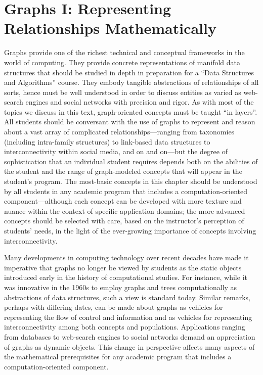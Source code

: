 
\chapter{Graphs I:
Representing Relationships Mathematically}
\label{ch:Graphs1}

Graphs provide one of the richest technical and conceptual frameworks in the world of computing.  They provide concrete representations of manifold data structures that should be studied in depth in preparation for a ``Data Structures and Algorithms'' course.  They embody tangible abstractions of relationships of all sorts, hence must be well understood in order to discuss entities as varied as web-search engines and social networks with precision and rigor.  As with most of the topics we discuss in this text, graph-oriented concepts must be taught ``in layers''.   All students should be conversant with the use of graphs to represent and reason about a vast array of complicated relationships---ranging from taxonomies (including intra-family structures) to link-based data structures to interconnectivity within social media, and on and on---but the degree of sophistication that an individual student requires depends both on the abilities of the student and the range of graph-modeled concepts that will appear in the student's program.  The most-basic concepts in this chapter should be understood by all students in any academic program that includes a computation-oriented component---although each concept can be developed with more texture and nuance within the context of specific application domains; the more advanced concepts should be selected with care, based on the instructor's perception of students' needs, in the light of the ever-growing importance of concepts involving interconnectivity.

Many developments in computing technology over recent decades have made it imperative that graphs no longer be viewed by students as the static objects introduced early in the history of computational studies.  For instance, while it was innovative in the 1960s to employ graphs and trees computationally as abstractions of data structures, such a view is standard today.  Similar remarks, perhaps with differing dates, can be made about graphs as vehicles for representing the flow of control and information and as vehicles for representing interconnectivity among both concepts and populations.  Applications ranging from databases to web-search engines to social networks demand an appreciation of graphs as dynamic objects.  This change in perspective
affects many aspects of the mathematical prerequisites for any academic program that includes a computation-oriented component.

